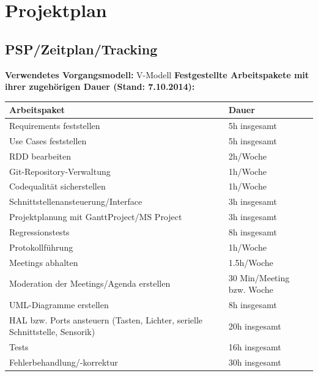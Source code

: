 \documentclass[oneside,a4paper,titlepage]{scrartcl} %
\begin{document}
\newpage

\section{Projektplan}

\subsection{PSP/Zeitplan/Tracking}
\textbf{Verwendetes Vorgangsmodell:} V-Modell\newline
\newline
\textbf{Festgestellte Arbeitspakete mit ihrer zugehörigen Dauer (Stand: 7.10.2014):}\newline
\newline
 \begin{small}
  \begin{tabular}{|p{8cm}|p{5cm}|}
   \hline
   \rowcolor{gray}\textbf{Arbeitspaket} & \textbf{Dauer}\\
   \hline
   Requirements feststellen & 5h insgesamt\\
   \hline
   Use Cases feststellen & 5h insgesamt\\
   \hline
   RDD bearbeiten & 2h/Woche\\
   \hline
   Git-Repository-Verwaltung & 1h/Woche\\
   \hline
   Codequalität sicherstellen & 1h/Woche\\
   \hline
   Schnittstellenansteuerung/Interface & 3h insgesamt\\
   \hline
   Projektplanung mit GanttProject/MS Project & 3h insgesamt\\
   \hline
   Regressionstests & 8h insgesamt\\
   \hline
   Protokollführung & 1h/Woche\\
   \hline
   Meetings abhalten & 1.5h/Woche\\
   \hline
   Moderation der Meetings/Agenda erstellen & 30 Min/Meeting bzw. Woche\\
   \hline
   UML-Diagramme erstellen & 8h insgesamt\\
   \hline
   HAL bzw. Ports ansteuern (Tasten, Lichter, serielle Schnittstelle, Sensorik) & 20h insgesamt\\
   \hline
   Tests & 16h insgesamt\\
   \hline
   Fehlerbehandlung/-korrektur & 30h insgesamt\\
   \hline
  \end{tabular}
\end{small}
\end{document}
